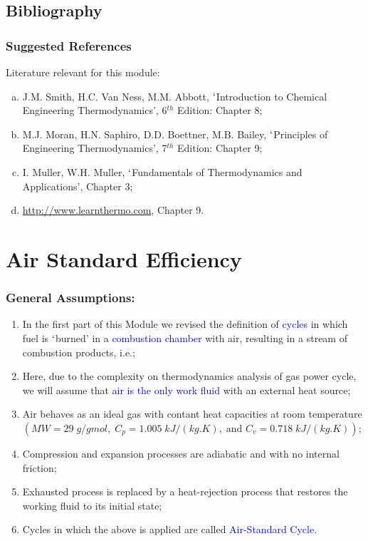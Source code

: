 \documentclass[10pt,compress]{beamer}
\begin{document}
\subsection{Bibliography} 
\begin{frame}
 \frametitle{Suggested References}
  Literature relevant for this module:
  \begin{enumerate}[(a)]
   \item J.M. Smith, H.C. Van Ness, M.M. Abbott, $\lq$Introduction to Chemical Engineering Thermodynamics', 6$^{th}$ Edition: Chapter 8;
   \item  M.J. Moran, H.N. Saphiro, D.D. Boettner, M.B. Bailey, $\lq$Principles of Engineering Thermodynamics',  7$^{th}$ Edition: Chapter 9;
   \item I. Muller, W.H. Muller, $\lq$Fundamentals of Thermodynamics and Applications', Chapter 3;
   \item \href{http://www.learnthermo.com}{http://www.learnthermo.com}, Chapter 9.
  \end{enumerate}
\end{frame}


\section{Air Standard Efficiency}
\begin{frame}
 \frametitle{General Assumptions:}
  \begin{enumerate}
   \item <1-> In the first part of this Module we revised the definition of \textcolor{blue}{cycles} in which fuel is $\lq$burned' in a \textcolor{blue}{combustion chamber} with air, resulting in a stream of combustion products, i.e.;
   \item <2-> Here, due to the complexity on thermodynamics analysis of gas power cycle, we will assume that \textcolor{blue}{air is the only work fluid} with an external heat source;
   \item <3-> Air behaves as an ideal gas with contant heat capacities at room  temperature $\left(MW=29\;g/gmol,\;C_{p}=1.005\;kJ/(kg.K),\;\text{and }C_{v}=0.718\;kJ/(kg.K)\right)$;
   \item <4-> Compression and expansion processes are adiabatic and with no internal friction;
   \item <5-> Exhausted process is replaced by a heat-rejection process that restores the working fluid to its initial state;
   \item <6-> Cycles in which the above is applied are called \textcolor{blue}{Air-Standard Cycle}.
  \end{enumerate}
\end{frame}
\end{document}
